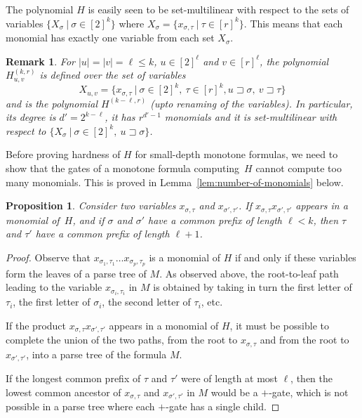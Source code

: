 \documentclass[11pt,a4paper]{article}
\newtheorem{proposition}[theorem]{Proposition}
\newtheorem{remark}[theorem]{Remark}
\newcommand{\prefix}{\sqsupset}
\newcommand{\comment}[2]{\marginpar{\tiny{\textbf{#1: }\textit{#2}}}}
\newcommand{\hf}[1]{\comment{HF}{#1}}
\newcommand{\st}[1]{\comment{ST}{#1}}
\begin{document}
The polynomial $H$ is easily seen to be set-multilinear with respect to
the sets of variables $\{ X_\sigma\ |\ \sigma \in [2]^k\}$
where $X_\sigma = \{x_{\sigma,\tau}\ |\ \tau \in [r]^{k} \}$. This means that each monomial has exactly one variable from each set $X_\sigma$.

\begin{remark}
	\label{rem:isomorphic-subpolynomials}
	For $|u|=|v|=\ell \leq k$, $u \in [2]^\ell$ and $v \in [r]^\ell$,
	the polynomial $H^{(k,r)}_{u,v}$
	is defined over the set of variables
	$$X_{u,v} = \{ x_{\sigma,\tau}\ |\ \sigma \in [2]^k,\ \tau \in [r]^{k}, u \prefix \sigma,\ v\prefix \tau\}$$
	and is the polynomial $H^{(k-\ell,r)}$ (upto renaming of the variables).
	In particular, its degree is $d'=2^{k-\ell}$,
	it has $r^{d'-1}$ monomials 
	and it is set-multilinear with
	respect to $\{ X_\sigma\ |\ \sigma \in [2]^k,\ u\prefix \sigma\}$.
\end{remark}

Before proving hardness of $H$ for small-depth monotone formulas, we need to show that the gates of a monotone formula computing~\(H\) cannot compute too many monomials. This is proved in Lemma~\ref{lem:number-of-monomials} below.

\begin{proposition}
	\label{prop:product-of-variables-in-H}
	Consider two variables $x_{\sigma,\tau}$ and $x_{\sigma',\tau'}$.
	If $x_{\sigma,\tau} x_{\sigma',\tau'}$ appears in a monomial of~$H$,
	and if $\sigma$ and $\sigma'$ have a common prefix of length $\ell < k$,
	then $\tau$ and $\tau'$ have a common prefix of length $\ell+1$.
\end{proposition}

\begin{proof}
	Observe that
	$x_{\sigma_1,\tau_1} \ldots x_{\sigma_p,\tau_p}$ is a monomial of $H$ if and only if
	these variables
	form the leaves of a parse tree of $M$.
	As observed above, the root-to-leaf path leading to the variable
	$x_{\sigma_i,\tau_i}$ in $M$
	is obtained by taking in turn the first letter of  $\tau_i$, the first letter of $\sigma_i$, the second letter of $\tau_i$, etc.
	
	If the product $x_{\sigma,\tau} x_{\sigma',\tau'}$ appears in a monomial of $H$, it must
	be possible to complete
	the union of the two paths, from the root to $x_{\sigma,\tau}$ and from the root to $x_{\sigma',\tau'}$,
	into a parse tree of the formula $M$.
	
	If the longest common prefix of $\tau$ and $\tau'$ were of length at most $\ell$,
	then the lowest common ancestor of $x_{\sigma,\tau}$ and $x_{\sigma',\tau'}$ in $M$ would be a $+$-gate,
	which is not possible in a parse tree where each $+$-gate has a single child.
\end{proof}
\end{document}

